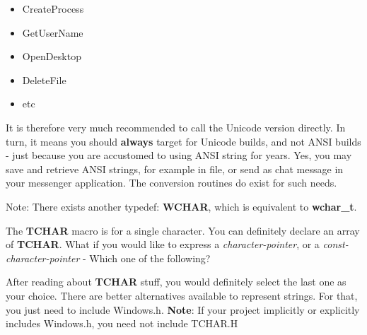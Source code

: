 	\begin{itemize}
		\item CreateProcess
		\item GetUserName
		\item OpenDesktop
		\item DeleteFile
		\item etc
	\end{itemize}
	
	
	It is therefore very much recommended to call the Unicode version directly. In turn, it means you should \textbf{always} target for Unicode builds, and not ANSI builds - just because you are accustomed to using ANSI string for years. Yes, you may save and retrieve ANSI strings, for example in file, or send as chat message in your messenger application. The conversion routines do exist for such needs.
	
	Note: There exists another typedef: \textbf{WCHAR}, which is equivalent to \textbf{wchar\_t}.
	
	The \textbf{TCHAR} macro is for a single character. You can definitely declare an array of \textbf{TCHAR}. What if you would like to express a \textit{character-pointer}, or a \textit{const-character-pointer} - Which one of the following?\\
	
	
	After reading about \textbf{TCHAR} stuff, you would definitely select the last one as your choice. There are better alternatives available to represent strings. For that, you just need to include Windows.h. \textbf{Note}: If your project implicitly or explicitly includes Windows.h, you need not include TCHAR.H
	
